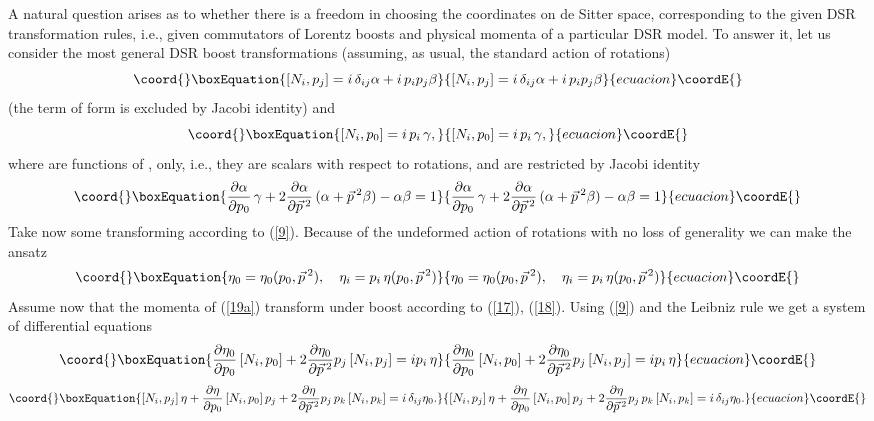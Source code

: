 \documentclass  [12pt] {article}
\def\vp{\vec{p}\, {}^2}
\providecommand{\dd}[2]{\frac{\partial #1}{\partial #2}}
\begin{document}
A natural question arises as to whether there is a freedom in choosing the
coordinates on de Sitter space, corresponding to the given DSR transformation
rules, i.e., given commutators of Lorentz boosts and physical momenta of a
particular DSR model. To answer it, let us consider the most general DSR boost
transformations (assuming, as usual, the standard action of rotations)
\begin{equation}\coord{}\boxEquation{\label{17}
[N_i, p_j] = i\, \delta_{ij} \alpha + i\, p_i p_j \beta
}{[N_i, p_j] = i\, \delta_{ij} \alpha + i\, p_i p_j \beta
}{ecuacion}\coordE{}\end{equation}
(the term of form \coordHE{} is excluded by Jacobi identity)
and
\begin{equation}\coord{}\boxEquation{\label{18}
[N_i, p_0] = i\, p_i\, \gamma,
}{[N_i, p_0] = i\, p_i\, \gamma,
}{ecuacion}\coordE{}\end{equation}
where \myHighlight{$\alpha, \beta, \gamma$}\coordHE{} are functions of \coordHE{}, \myHighlight{$\vp$}\coordHE{} only, i.e., they
are  scalars with respect to rotations, and  are restricted by Jacobi identity
\begin{equation}\coord{}\boxEquation{\label{jac}
 \dd{\alpha}{p_0}\, \gamma + 2 \dd{\alpha}{\vp}\, (\alpha + \vp\beta) - \alpha\beta  = 1
}{\dd{\alpha}{p_0}\, \gamma + 2 \dd{\alpha}{\vp}\, (\alpha + \vp\beta) - \alpha\beta  = 1
}{ecuacion}\coordE{}\end{equation}
 Take now some \myHighlight{$\eta_\mu$}\coordHE{} transforming according to
(\ref{9}).  Because of the undeformed action of rotations with no loss of
generality we can make the ansatz
\begin{equation}\coord{}\boxEquation{\label{19a}
 \eta_0 = \eta_0(p_0, \vp), \quad \eta_i = p_i\, \eta(p_0, \vp)
}{\eta_0 = \eta_0(p_0, \vp), \quad \eta_i = p_i\, \eta(p_0, \vp)
}{ecuacion}\coordE{}\end{equation}
Assume now that the momenta of (\ref{19a}) transform under boost according to
(\ref{17}), (\ref{18}). Using (\ref{9}) and the Leibniz rule we get a system of
differential equations
\begin{equation}\coord{}\boxEquation{\label{19}
\dd{\eta_0}{p_0}\, [N_i, p_0] + 2 \dd{\eta_0}{\vp} p_j\, [N_i, p_j] = i p_i\,
\eta
}{\dd{\eta_0}{p_0}\, [N_i, p_0] + 2 \dd{\eta_0}{\vp} p_j\, [N_i, p_j] = i p_i\,
\eta
}{ecuacion}\coordE{}\end{equation}
\begin{equation}\coord{}\boxEquation{\label{20}
[N_i, p_j]\, \eta + \dd{\eta}{p_0}\, [N_i, p_0]\, p_j+ 2 \dd{\eta}{\vp} p_j\,
p_k\, [N_i, p_k] = i\, \delta_{ij} \eta_0.
}{[N_i, p_j]\, \eta + \dd{\eta}{p_0}\, [N_i, p_0]\, p_j+ 2 \dd{\eta}{\vp} p_j\,
p_k\, [N_i, p_k] = i\, \delta_{ij} \eta_0.
}{ecuacion}\coordE{}\end{equation}
\end{document}
